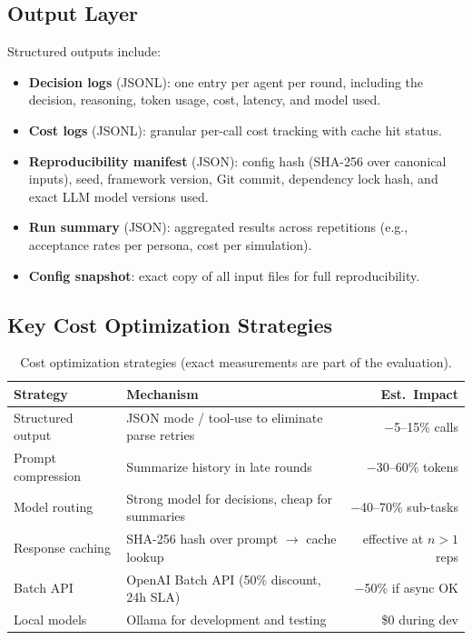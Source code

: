 \documentclass[12pt, a4paper]{article}
\begin{document}
\subsection*{Output Layer}

Structured outputs include:
\begin{itemize}
    \item \textbf{Decision logs} (JSONL): one entry per agent per round, including the decision, reasoning, token usage, cost, latency, and model used.
    \item \textbf{Cost logs} (JSONL): granular per-call cost tracking with cache hit status.
    \item \textbf{Reproducibility manifest} (JSON): config hash (SHA-256 over canonical inputs), seed, framework version, Git commit, dependency lock hash, and exact LLM model versions used.
    \item \textbf{Run summary} (JSON): aggregated results across repetitions (e.g., acceptance rates per persona, cost per simulation).
    \item \textbf{Config snapshot}: exact copy of all input files for full reproducibility.
\end{itemize}

\subsection*{Key Cost Optimization Strategies}

\begin{table}[H]
    \centering
    \small
    \begin{tabularx}{\textwidth}{lXr}
        \toprule
        \textbf{Strategy} & \textbf{Mechanism} & \textbf{Est.\ Impact} \\
        \midrule
        Structured output    & JSON mode / tool-use to eliminate parse retries              & $-$5--15\% calls \\
        Prompt compression   & Summarize history in late rounds                             & $-$30--60\% tokens \\
        Model routing        & Strong model for decisions, cheap for summaries               & $-$40--70\% sub-tasks \\
        Response caching     & SHA-256 hash over prompt $\to$ cache lookup                   & effective at $n{>}1$ reps \\
        Batch API            & OpenAI Batch API (50\% discount, 24h SLA)                    & $-$50\% if async OK \\
        Local models         & Ollama for development and testing                            & \$0 during dev \\
        \bottomrule
    \end{tabularx}
    \caption{Cost optimization strategies (exact measurements are part of the evaluation).}
    \label{tab:cost}
\end{table}
\end{document}
